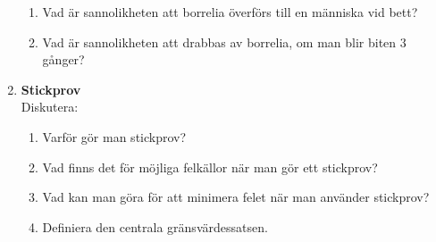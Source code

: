 \documentclass[a4paper,10pt]{article}
\begin{document}
\begin{enumerate}
    \begin{enumerate}
        \item{Vad är sannolikheten att borrelia överförs till en människa vid bett?}
        \vspace{6cm}
        \item{Vad är sannolikheten att drabbas av borrelia, om man blir biten $3$ gånger?}
    \end{enumerate}
    \newpage
    \item{{\bf Stickprov} \\ Diskutera:}
    \begin{enumerate}
        \item{Varför gör man stickprov?}
        \vspace{5cm}
        \item{Vad finns det för möjliga felkällor när man gör ett stickprov?}
        \vspace{5cm}
        \item{Vad kan man göra för att minimera felet när man använder stickprov?}
        \vspace{5cm}
        \item{Definiera den centrala gränsvärdessatsen.}
    \end{enumerate}
\end{enumerate}
\end{document}
